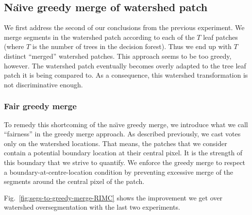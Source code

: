 \subsection*{Na\"{\i}ve greedy merge of watershed patch}
We first address the second of our conclusions from the previous experiment. We merge segments in the watershed patch according to each of the $T$ leaf patches (where $T$ is the number of trees in the decision forest). Thus we end up with $T$ distinct ``merged'' watershed patches. This approach seems to be too greedy, however. The watershed patch eventually becomes overly adapted to the tree leaf patch it is being compared to. As a consequence, this watershed transformation is not discriminative enough.

\subsubsection*{Fair greedy merge}
To remedy this shortcoming of the na\"{\i}ve greedy merge, we introduce what we call ``fairness'' in the greedy merge approach. As described previously, we cast votes only on the watershed locations. That means, the patches that we consider contain a potential boundary location at their central pixel. It is the strength of this boundary that we strive to quantify. We enforce the greedy merge to respect a boundary-at-centre-location condition by preventing excessive merge of the segments around the central pixel of the patch.

Fig.~\ref{fig:segs-to-greedy-merge-RIMC} shows the improvement we get over watershed oversegmentation with the last two experiments.


